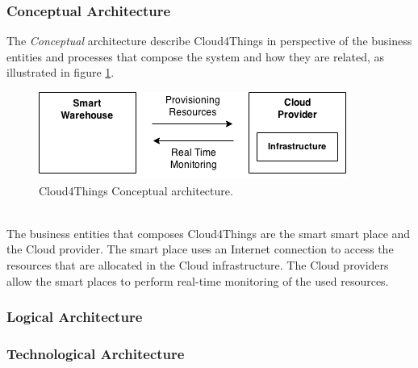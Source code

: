\subsubsection{Conceptual Architecture}
\label{subs:conceptual_architecture}
The \textit{Conceptual} architecture describe Cloud4Things in perspective of
the business entities and processes that compose the system and how they are related,
as illustrated in figure \ref{fig:conceptual_architecture}.
\begin{figure}[h!]
  \centering
  \includegraphics[width=.8\textwidth]{./images/conceptual-architecture}
  \caption{Cloud4Things Conceptual architecture.}
  \label{fig:conceptual_architecture}
\end{figure}\\
The business entities that composes Cloud4Things are the smart smart place and the
Cloud provider. The smart place uses an Internet connection to access the resources
that are allocated in the Cloud infrastructure. The Cloud providers allow the smart
places to perform real-time monitoring of the used resources.    
\subsubsection{Logical Architecture}
\label{subs:logical_architecture}

\subsubsection{Technological Architecture}
\label{subs:technological_architecture}

